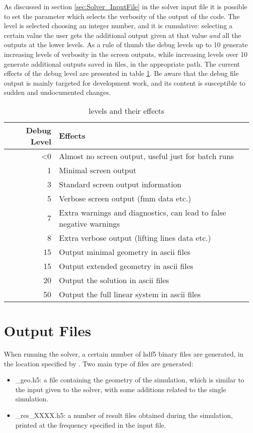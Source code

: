 As discussed in section \ref{sec:Solver_InputFile} in the solver input 
file it is possible to set the parameter  which selects 
the verbosity of the output of the code. The level is selected choosing an 
integer number, and it is cumulative: selecting a certain value the user gets 
the additional output given at that value \emph{and} all the outputs at the lower levels. 
As a rule of thumb the debug levels up to 10 generate increasing levels of 
verbosity in the screen outputs, while increasing levels over 10 generate 
additional outputs saved in files, in the appropriate  path. 
The current effects of the debug level are presented in table \ref{tab:debug_level}. 
Be aware that the debug file output is mainly targeted for development work, and its 
content is susceptible to sudden and undocumented changes. 

\begin{table}[]
\centering
\begin{tabular}{@{}rl@{}}
\toprule
Debug Level & Effects \\ \midrule
<0            & Almost no screen output, useful just for batch runs        \\
1             & Minimal screen output        \\
3             & Standard screen output information         \\ 
5             & Verbose screen output (fmm data etc.)\\
7             & Extra warnings and diagnostics, can lead to false negative warnings\\ 
8             & Extra verbose output (lifting lines data etc.)\\\midrule
15            & Output minimal geometry in ascii files \\
15            & Output extended geometry in ascii files \\
20            & Output the solution in ascii files \\
50            & Output the full linear system in ascii files\\
\bottomrule
\end{tabular}
\caption{ levels and their effects}
\label{tab:debug_level}
\end{table}

\section{Output Files}
\label{sec:Solver_Output_Files}

When running the solver, a certain number of hdf5 binary files are generated, 
in the location specified by . Two main type of files are generated:
\begin{itemize}
    \item {}\_geo.h5: a file containing the geometry of the simulation, 
    which is similar to the input given to the solver, with some additions related 
    to the single simulation.
    \item {}\_res\_XXXX.h5: a number of result files obtained during 
    the simulation, printed at the frequency specified in the input file. 
\end{itemize}
